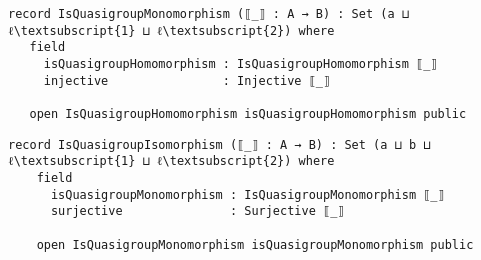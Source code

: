 \begin{Verbatim}[commandchars=\\\{\},samepage=true]
 record IsQuasigroupMonomorphism (⟦_⟧ : A → B) : Set (a ⊔ ℓ\textsubscript{1} ⊔ ℓ\textsubscript{2}) where
   field
     isQuasigroupHomomorphism : IsQuasigroupHomomorphism ⟦_⟧
     injective                : Injective ⟦_⟧

   open IsQuasigroupHomomorphism isQuasigroupHomomorphism public
\end{Verbatim}
\begin{comment}

    ∙-isMagmaMonomorphism   : ∙.IsMagmaMonomorphism ⟦_⟧
    ∙-isMagmaMonomorphism   = record
      \{ isMagmaHomomorphism = ∙-isMagmaHomomorphism
      ; injective           = injective
      \}

    \textbackslash\textbackslash-isMagmaMonomorphism  : \textbackslash\textbackslash.IsMagmaMonomorphism ⟦_⟧
    \textbackslash\textbackslash-isMagmaMonomorphism  = record
      \{ isMagmaHomomorphism = \textbackslash\textbackslash-isMagmaHomomorphism
      ; injective                   = injective
      \}

    //-isMagmaMonomorphism  : //.IsMagmaMonomorphism ⟦_⟧
    //-isMagmaMonomorphism  = record
      \{ isMagmaHomomorphism = //-isMagmaHomomorphism
      ; injective           = injective
      \}

    open //.IsMagmaMonomorphism //-isMagmaMonomorphism public
      using (isRelMonomorphism)

\end{comment}
\begin{Verbatim}[commandchars=\\\{\},samepage=true]
 record IsQuasigroupIsomorphism (⟦_⟧ : A → B) : Set (a ⊔ b ⊔ ℓ\textsubscript{1} ⊔ ℓ\textsubscript{2}) where
    field
      isQuasigroupMonomorphism : IsQuasigroupMonomorphism ⟦_⟧
      surjective               : Surjective ⟦_⟧

    open IsQuasigroupMonomorphism isQuasigroupMonomorphism public
\end{Verbatim}
\begin{comment}
    ∙-isMagmaIsomorphism    : ∙.IsMagmaIsomorphism ⟦_⟧
    ∙-isMagmaIsomorphism    = record
      \{ isMagmaMonomorphism = ∙-isMagmaMonomorphism
      ; surjective          = surjective
      \}

    \textbackslash\textbackslash-isMagmaIsomorphism   : \textbackslash\textbackslash.IsMagmaIsomorphism ⟦_⟧
    \textbackslash\textbackslash-isMagmaIsomorphism   = record
      \{ isMagmaMonomorphism = \textbackslash\textbackslash-isMagmaMonomorphism
      ; surjective          = surjective
      \}

    //-isMagmaIsomorphism   : //.IsMagmaIsomorphism ⟦_⟧
    //-isMagmaIsomorphism   = record
      \{ isMagmaMonomorphism = //-isMagmaMonomorphism
      ; surjective          = surjective
      \}

    open //.IsMagmaIsomorphism //-isMagmaIsomorphism public
      using (isRelIsomorphism)
\end{comment}

